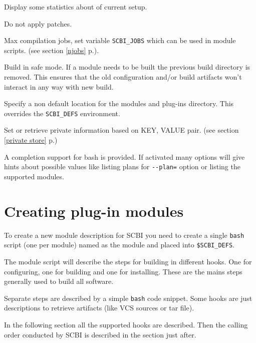 \documentclass[a4paper,12pt,twoside]{article}
\newcommand{\code}[1]{\texttt{#1}}
\newcommand{\seeref}[1]{see section \ref{#1} p.\pageref{#1}}
\let\stdsection\section
\renewcommand\section{\newpage\stdsection}
\newcommand{\ddash}{-{}-}
\begin{document}
\begin{description}[font=\texttt]
	\item[\ddash{}stat] Display some statistics about of current setup.

	\item[-n | \ddash{}no-patch] Do not apply patches.

	\item[-j | \ddash{}jobs=<n>] Max compilation jobs, set variable \code{SCBI\_JOBS} which can be used in module scripts. (\seeref{njobs}).

	\item[\ddash{}safe] Build in safe mode. If a module needs to be built the previous build directory is removed. This ensures that the old configuration and/or build artifacts won't interact in any way with new build.

	\item[\ddash{}plugins=<directory>] Specify a non default location for the modules and plug-ins directory. This overrides the \code{SCBI\_DEFS} environment.

	\item[\ddash{}store KEY <VALUE>] Set or retrieve private information based on KEY, VALUE pair. (\seeref{private store})

\end{description}

A completion support for bash is provided. If activated many options will give hints about possible values like listing plans for \code{\ddash{}plan=} option or listing the supported modules.


\section{Creating plug-in modules}

To create a new module description for SCBI you need to create a single \code{bash} script (one per module) named as the module and placed into \code{\$SCBI\_DEFS}.

The module script will describe the steps for building in different hooks. One for configuring, one for building and one for installing. These are the mains steps generally used to build all software.

Separate steps are described by a simple \code{bash} code snippet. Some hooks are just descriptions to retrieve artifacts (like VCS sources or tar file).

In the following section all the supported hooks are described. Then the calling order conducted by SCBI is described in the section just after.
\end{document}
